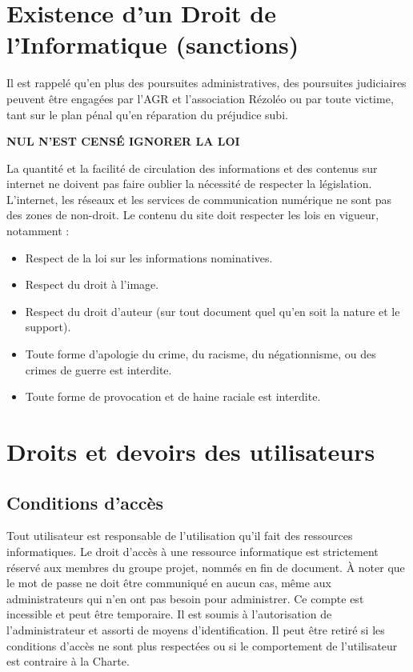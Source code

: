 \documentclass[10pt,a4paper]{article}
\begin{document}
\section{Existence d'un Droit de l'Informatique (sanctions)}
Il est rappelé qu'en plus des poursuites administratives, des poursuites judiciaires peuvent être engagées par l'AGR et l'association Rézoléo ou par toute victime, tant sur le plan pénal qu'en réparation du préjudice subi.
\begin{center}
\textbf{NUL N'EST CENSÉ IGNORER LA LOI}
\end{center}

La quantité et la facilité de circulation des informations et des contenus sur internet ne doivent pas faire oublier la nécessité de respecter la législation. L'internet, les réseaux et les services de communication numérique ne sont pas des zones de non-droit.
Le contenu du site doit respecter les lois en vigueur, notamment :
\begin{itemize}
\item Respect de la loi sur les informations nominatives.
\item Respect du droit à l'image.
\item Respect du droit d'auteur (sur tout document quel qu'en soit la nature et le support).
\item Toute forme d'apologie du crime, du racisme, du négationnisme, ou des crimes de guerre est interdite.
\item Toute forme de provocation et de haine raciale est interdite.
\end{itemize}


\section{Droits et devoirs des utilisateurs}
\subsection{Conditions d'accès}
Tout utilisateur est responsable de l'utilisation qu'il fait des ressources informatiques. Le droit d'accès à une ressource informatique est strictement réservé aux membres du groupe projet, nommés en fin de document. À noter que le mot de passe ne doit être communiqué en aucun cas, même aux administrateurs qui n'en ont pas besoin pour administrer. Ce compte est incessible et peut être temporaire. Il est soumis à l'autorisation de l'administrateur et assorti de moyens d'identification. Il peut être retiré si les conditions d'accès ne sont plus respectées ou si le comportement de l'utilisateur est contraire à la Charte.\\
\end{document}
